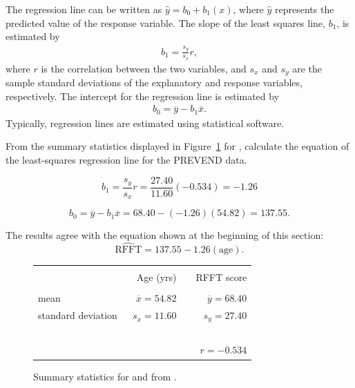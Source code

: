 The regression line can be written as $\hat{y} = b_0 + b_1(x)$, where $\hat{y}$ represents the predicted value of the response variable. The slope of the least squares line, $b_1$, is estimated by
\begin{align}
b_1 = \frac{s_y}{s_x} r,
\label{slopeOfLSRLine}
\end{align}
where $r$ is the correlation between the two variables, and $s_x$ and $s_y$ are the sample standard deviations of the explanatory and response variables, respectively. The intercept for the regression line is estimated by
\begin{align}
b_0 = \overline{y} - b_1\overline{x}.
\label{interceptOfLSRLine}
\end{align}
Typically, regression lines are estimated using statistical software.

\textD{\newpage}

\begin{examplewrap}
\begin{nexample}{From the summary statistics displayed in Figure~\ref{summaryAgeRFFT} for , calculate the equation of the least-squares regression line for the PREVEND data.}

\[b_1 = \frac{s_y}{s_x} r = \frac{27.40}{11.60}(-0.534) = -1.26\]

\[b_0 = \overline{y} - b_1\overline{x} = 68.40 - (-1.26)(54.82) = 137.55. \]

The results agree with the equation shown at the beginning of this section:
\[\widehat{\text{RFFT}} = 137.55 - 1.26(\text{age}).\]
\end{nexample}
\end{examplewrap}

\begin{figure}[ht]
	\centering
	\begin{tabular}{l rr}
		\hline
		\vspace{-4mm} & & \\
		\vspace{0.4mm}	&	\ \ Age (yrs)	& \ \ RFFT score \\
		\hline
		\vspace{-3.9mm} & & \\
		mean	& $\overline{x} = 54.82$		& $\overline{y} = 68.40$ \\
		standard deviation		& $s_x = 11.60$		& $s_y = 27.40$\vspace{0.4mm} \\
		\hline
		\vspace{-4mm}\ &\\
		& \multicolumn{2}{r}{$r=-0.534$} \\
		\hline
	\end{tabular}
	\caption{Summary statistics for  and  from .}
	\label{summaryAgeRFFT}
\end{figure}

